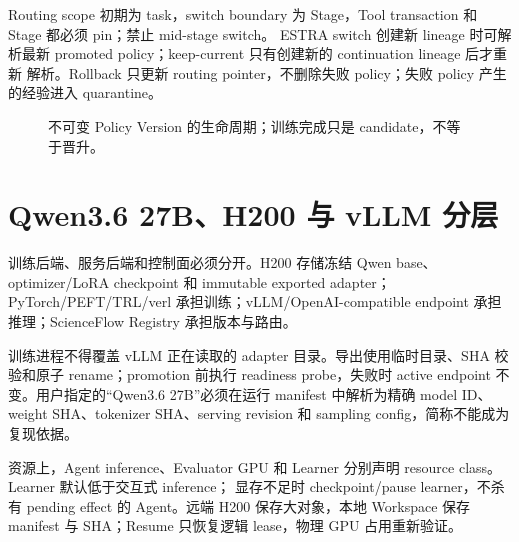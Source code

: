 \documentclass[UTF8,11pt,a4paper]{ctexart}
\begin{document}
Routing scope 初期为 task，switch boundary 为 Stage，Tool transaction 和 Stage 都必须 pin；禁止 mid-stage switch。
ESTRA switch 创建新 lineage 时可解析最新 promoted policy；keep-current 只有创建新的 continuation lineage 后才重新
解析。Rollback 只更新 routing pointer，不删除失败 policy；失败 policy 产生的经验进入 quarantine。

\begin{figure}[htbp]
  \centering
  \caption{不可变 Policy Version 的生命周期；训练完成只是 candidate，不等于晋升。}
\end{figure}

\section{Qwen3.6 27B、H200 与 vLLM 分层}

训练后端、服务后端和控制面必须分开。H200 存储冻结 Qwen base、optimizer/LoRA checkpoint 和 immutable exported
adapter；PyTorch/PEFT/TRL/verl 承担训练；vLLM/OpenAI-compatible endpoint 承担推理；ScienceFlow Registry
承担版本与路由。

训练进程不得覆盖 vLLM 正在读取的 adapter 目录。导出使用临时目录、SHA 校验和原子 rename；promotion 前执行
readiness probe，失败时 active endpoint 不变。用户指定的“Qwen3.6 27B”必须在运行 manifest 中解析为精确
model ID、weight SHA、tokenizer SHA、serving revision 和 sampling config，简称不能成为复现依据。

资源上，Agent inference、Evaluator GPU 和 Learner 分别声明 resource class。Learner 默认低于交互式 inference；
显存不足时 checkpoint/pause learner，不杀有 pending effect 的 Agent。远端 H200 保存大对象，本地 Workspace
保存 manifest 与 SHA；Resume 只恢复逻辑 lease，物理 GPU 占用重新验证。
\end{document}
